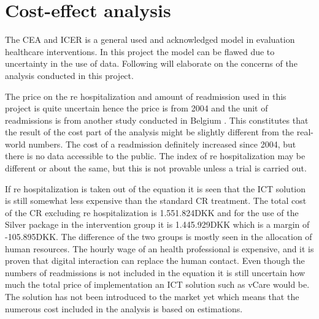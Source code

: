  


\section{Cost-effect analysis}

The CEA and ICER is a general used and acknowledged model in evaluation healthcare interventions. In this project the model can be flawed due to uncertainty in the use of data.  Following will elaborate on the concerns of the analysis conducted in this project. 

The price on the re hospitalization and amount of readmission used in this project is quite uncertain hence the price is from 2004 and the unit of readmissions is from another study conducted in Belgium \cite{costeffect, rasmussen2011hjerterehabilitering}. This constitutes that the result of the cost part of the analysis might be slightly different from the real-world numbers. The cost of a readmission definitely increased since 2004, but there is no data accessible to the public. The index of re hospitalization may be different or about the same, but this is not provable unless a trial is carried out. 

If re hospitalization is taken out of the equation it is seen that the ICT solution is still somewhat less expensive than the standard CR treatment. The total cost of the CR excluding re hospitalization is 1.551.824DKK and for the use of the Silver package in the intervention group it is 1.445.929DKK which is a margin of -105.895DKK. The difference of the two groups is mostly seen in the allocation of human resources. The hourly wage of an health professional is expensive, and it is proven that digital interaction can replace the human contact. Even though the numbers of readmissions is not included in the equation it is still uncertain how much the total price of implementation an ICT solution such as vCare would be. The solution has not been introduced to the market yet which means that the numerous cost included in the analysis is based on estimations. 


